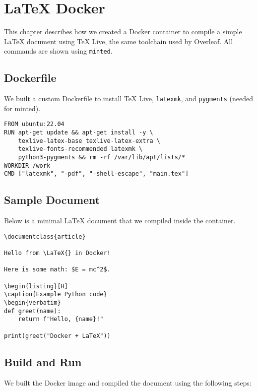 \chapter{LaTeX Docker}
\label{ch:latex-docker}

This chapter describes how we created a Docker container to compile a simple 
\LaTeX{} document using TeX Live, the same toolchain used by Overleaf. 
All commands are shown using \texttt{minted}.

\section{Dockerfile}
We built a custom Dockerfile to install TeX Live, \texttt{latexmk}, and 
\texttt{pygments} (needed for minted).

\begin{listing}[H]
\caption{Dockerfile for LaTeX builds}
\begin{verbatim}
FROM ubuntu:22.04
RUN apt-get update && apt-get install -y \
    texlive-latex-base texlive-latex-extra \
    texlive-fonts-recommended latexmk \
    python3-pygments && rm -rf /var/lib/apt/lists/*
WORKDIR /work
CMD ["latexmk", "-pdf", "-shell-escape", "main.tex"]
\end{verbatim}
\end{listing}

\section{Sample Document}
Below is a minimal \LaTeX{} document that we compiled inside the container.

\begin{listing}[H]
\caption{main.tex example}
\begin{verbatim}
\documentclass{article}

Hello from \LaTeX{} in Docker!

Here is some math: $E = mc^2$.

\begin{listing}[H]
\caption{Example Python code}
\begin{verbatim}
def greet(name):
    return f"Hello, {name}!"

print(greet("Docker + LaTeX"))
\end{verbatim}
\end{listing}


\section{Build and Run}
We built the Docker image and compiled the document using the following steps:

